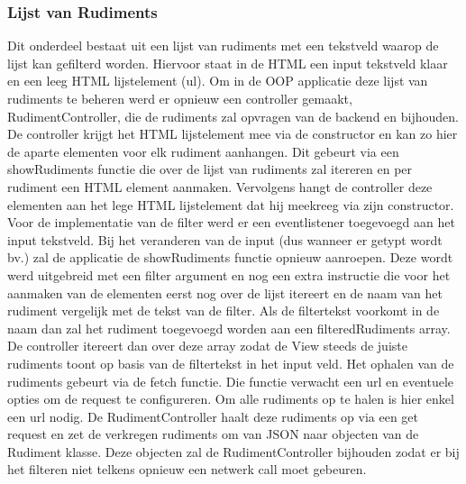  \subsubsection{Lijst van Rudiments}
 Dit onderdeel bestaat uit een lijst van rudiments met een tekstveld waarop de lijst kan gefilterd worden. Hiervoor staat in de HTML een input tekstveld klaar en een leeg HTML lijstelement (ul). Om in de OOP applicatie deze lijst van rudiments te beheren werd er opnieuw een controller gemaakt, RudimentController, die de rudiments zal opvragen van de backend en bijhouden. De controller krijgt het HTML lijstelement mee via de constructor en kan zo hier de aparte elementen voor elk rudiment aanhangen. Dit gebeurt via een showRudiments functie die over de lijst van rudiments zal itereren en per rudiment een HTML element aanmaken. Vervolgens hangt de controller deze elementen aan het lege HTML lijstelement dat hij meekreeg via zijn constructor. Voor de implementatie van de filter werd er een eventlistener toegevoegd aan het input tekstveld. Bij het veranderen van de input (dus wanneer er getypt wordt bv.) zal de applicatie de showRudiments functie opnieuw aanroepen. Deze wordt werd uitgebreid met een filter argument en nog een extra instructie die voor het aanmaken van de elementen eerst nog over de lijst itereert en de naam van het rudiment vergelijk met de tekst van de filter. Als de filtertekst voorkomt in de naam dan zal het rudiment toegevoegd worden aan een filteredRudiments array. De controller itereert dan over deze array zodat de View steeds de juiste rudiments toont op basis van de filtertekst in het input veld. Het ophalen van de rudiments gebeurt via de fetch functie. Die functie verwacht een url en eventuele opties om de request te configureren. Om alle rudiments op te halen is hier enkel een url nodig. De RudimentController haalt deze rudiments op via een get request en zet de verkregen rudiments om van JSON naar objecten van de Rudiment klasse. Deze objecten zal de RudimentController bijhouden zodat er bij het filteren niet telkens opnieuw een netwerk call moet gebeuren.

